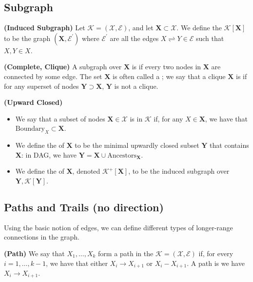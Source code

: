 \documentclass{article}
\newcommand{\bfs}[1]{\textbf{({#1}) }}
\begin{document}
\subsection{Subgraph}
\begin{defa}\bfs{Induced Subgraph}
Let $\mathcal{K}=(\mathcal{X}, \mathcal{E})$, and let $\boldsymbol{X} \subset \mathcal{X} .$ We define the  $\mathcal{K}[\boldsymbol{X}]$ to be the graph $\left(\boldsymbol{X}, \mathcal{E}^{\prime}\right)$ where $\mathcal{E}^{\prime}$ are all the edges $X \rightleftharpoons Y \in \mathcal{E}$ such that $X, Y \in X$.
\end{defa}
\begin{defa}\bfs{Complete, Clique}
A subgraph over $\boldsymbol{X}$ is  if every two nodes in $\boldsymbol{X}$ are connected by some edge. The set $\boldsymbol{X}$ is often called a ; we say that a clique $\boldsymbol{X}$ is  if for any superset of nodes $\boldsymbol{Y} \supset \boldsymbol{X}$, $\boldsymbol{Y}$ is not a clique.
\end{defa}
\begin{defa}\bfs{Upward Closed}\label{def:dnmfa}
\begin{itemize}
    \item We say that a subset of nodes $\boldsymbol{X} \in \mathcal{X}$ is  in $\mathcal{K}$ if, for any $X \in \boldsymbol{X}$, we have that  $\mathrm{Boundary}_{X} \subset \boldsymbol{X}$.
    \item We define the  of $\boldsymbol{X}$ to be the minimal upwardly closed subset $\boldsymbol{Y}$ that contains $\boldsymbol{X}$: in DAG, we have $\boldsymbol{Y}=\boldsymbol{X}\cup \mathrm{Ancestors}_{\boldsymbol{X}}$.
    \item  We define the   of $\boldsymbol{X}$, denoted $\mathcal{K}^{+}[\boldsymbol{X}]$, to be the induced subgraph over $\boldsymbol{Y}, \mathcal{K}[\boldsymbol{Y}]$.
\end{itemize}
\end{defa}


\subsection{Paths and Trails (no direction)}
Using the basic notion of edges, we can define different types of longer-range connections in the graph.
\begin{defa}\bfs{Path}
We say that $X_{1}, \ldots, X_{k}$ form a path in the  $\mathcal{K}=(\mathcal{X}, \mathcal{E})$ if, for every $i=1, \ldots, k-1$, we have that either $X_{i} \rightarrow X_{i+1}$ or $X_{i}-X_{i+1}$. A path is  we have $X_{i} \rightarrow X_{i+1}$.
\end{defa}
\end{document}

